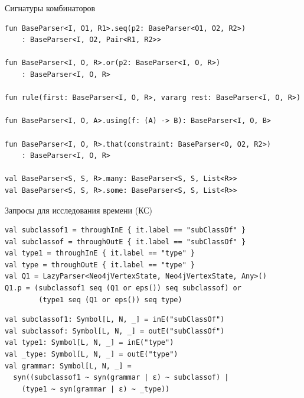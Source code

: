 \documentclass[aspectratio=169]{beamer}
\begin{document}
\appendix


\begin{frame}[fragile]{Сигнатуры комбинаторов}

  \begin{verbatim}
fun BaseParser<I, O1, R1>.seq(p2: BaseParser<O1, O2, R2>)
    : BaseParser<I, O2, Pair<R1, R2>>

fun BaseParser<I, O, R>.or(p2: BaseParser<I, O, R>)
    : BaseParser<I, O, R>

fun rule(first: BaseParser<I, O, R>, vararg rest: BaseParser<I, O, R>)

fun BaseParser<I, O, A>.using(f: (A) -> B): BaseParser<I, O, B>

fun BaseParser<I, O, R>.that(constraint: BaseParser<O, O2, R2>)
    : BaseParser<I, O, R> 
    
val BaseParser<S, S, R>.many: BaseParser<S, S, List<R>>
val BaseParser<S, S, R>.some: BaseParser<S, S, List<R>>
\end{verbatim}

\end{frame}

\begin{frame}[fragile]{Запросы для исследования времени (КС)}
  \begin{verbatim}
val subclassof1 = throughInE { it.label == "subClassOf" }
val subclassof = throughOutE { it.label == "subClassOf" }
val type1 = throughInE { it.label == "type" }
val type = throughOutE { it.label == "type" }
val Q1 = LazyParser<Neo4jVertexState, Neo4jVertexState, Any>()
Q1.p = (subclassof1 seq (Q1 or eps()) seq subclassof) or
        (type1 seq (Q1 or eps()) seq type)
\end{verbatim}
  \begin{verbatim}
val subclassof1: Symbol[L, N, _] = inE("subClassOf")
val subclassof: Symbol[L, N, _] = outE("subClassOf")
val type1: Symbol[L, N, _] = inE("type")
val _type: Symbol[L, N, _] = outE("type")
val grammar: Symbol[L, N, _] = 
  syn((subclassof1 ~ syn(grammar | ε) ~ subclassof) |
    (type1 ~ syn(grammar | ε) ~ _type))
\end{verbatim}


\end{frame}
\end{document}
